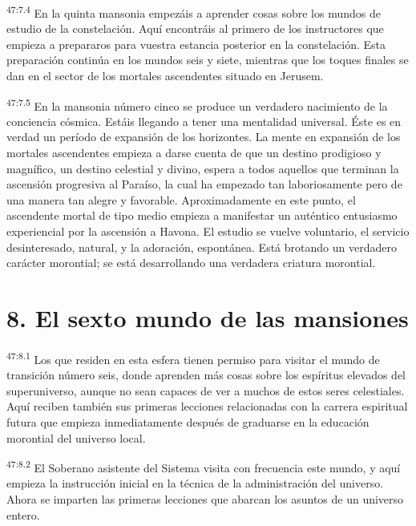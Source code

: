 \par
\textsuperscript{47:7.4} En la quinta mansonia empezáis a aprender cosas sobre los mundos de estudio de la constelación. Aquí encontráis al primero de los instructores que empieza a prepararos para vuestra estancia posterior en la constelación. Esta preparación continúa en los mundos seis y siete, mientras que los toques finales se dan en el sector de los mortales ascendentes situado en Jerusem.

\par
\textsuperscript{47:7.5} En la mansonia número cinco se produce un verdadero nacimiento de la conciencia cósmica. Estáis llegando a tener una mentalidad universal. Éste es en verdad un período de expansión de los horizontes. La mente en expansión de los mortales ascendentes empieza a darse cuenta de que un destino prodigioso y magnífico, un destino celestial y divino, espera a todos aquellos que terminan la ascensión progresiva al Paraíso, la cual ha empezado tan laboriosamente pero de una manera tan alegre y favorable. Aproximadamente en este punto, el ascendente mortal de tipo medio empieza a manifestar un auténtico entusiasmo experiencial por la ascensión a Havona. El estudio se vuelve voluntario, el servicio desinteresado, natural, y la adoración, espontánea. Está brotando un verdadero carácter morontial; se está desarrollando una verdadera criatura morontial.

\section*{8. El sexto mundo de las mansiones}
\par
\textsuperscript{47:8.1} Los que residen en esta esfera tienen permiso para visitar el mundo de transición número seis, donde aprenden más cosas sobre los espíritus elevados del superuniverso, aunque no sean capaces de ver a muchos de estos seres celestiales. Aquí reciben también sus primeras lecciones relacionadas con la carrera espiritual futura que empieza inmediatamente después de graduarse en la educación morontial del universo local.

\par
\textsuperscript{47:8.2} El Soberano asistente del Sistema visita con frecuencia este mundo, y aquí empieza la instrucción inicial en la técnica de la administración del universo. Ahora se imparten las primeras lecciones que abarcan los asuntos de un universo entero.

